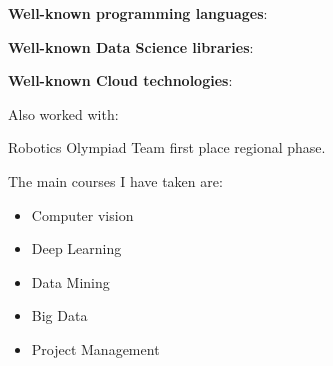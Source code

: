 
\textbf{Well-known programming languages}:
\begin{center}
\end{center}
\divider{}

\textbf{Well-known Data Science libraries}:
\begin{center}
\end{center}
\divider{}

\textbf{Well-known Cloud technologies}:
\begin{center}
\end{center}
\divider{}

Also worked with:
\begin{center}
\end{center}
\divider{}


\cvachievement{\faTrophy}
{Robotics Olympiad \smallskip}
{\small{}%
  \small{}}
Team first place regional phase.

\medskip

The main courses I have taken are:

\begin{itemize}
  \item Computer vision
  \item Deep Learning
  \item Data Mining
  \item Big Data
  \item Project Management
\end{itemize}


